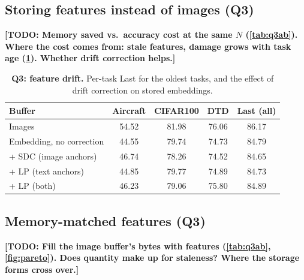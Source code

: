 \documentclass[10pt,twocolumn,letterpaper]{article}
\newcommand{\TODO}[1]{\textbf{\color{red}[TODO: #1]}}
\newcommand{\Q}[1]{\textbf{Q#1}\xspace}     %
\begin{document}
\subsection{Storing features instead of images (\Q{3})}
\label{sec:disc-q3a}
\TODO{Memory saved vs.\ accuracy cost at the same $N$ (\cref{tab:q3ab}). Where the cost comes from: stale features, damage grows with task age (\cref{tab:drift}). Whether drift correction helps.}

\begin{table}[t]
\centering
\small
\setlength{\tabcolsep}{4pt}
\caption{\textbf{\Q{3}: feature drift.} Per-task Last for the oldest tasks,
and the effect of drift correction on stored embeddings.}
\label{tab:drift}
\begin{tabular}{@{}l ccc c@{}}
\toprule
Buffer & Aircraft & CIFAR100 & DTD & Last (all) \\
\midrule
Images                       & 54.52 & 81.98 & 76.06 & 86.17 \\
Embedding, no correction     & 44.55 & 79.74 & 74.73 & 84.79 \\
\quad + SDC (image anchors)  & 46.74 & 78.26 & 74.52 & 84.65 \\
\quad + LP (text anchors)    & 44.85 & 79.77 & 74.89 & 84.73 \\
\quad + LP (both)            & 46.23 & 79.06 & 75.80 & 84.89 \\
\bottomrule
\end{tabular}
\end{table}

\subsection{Memory-matched features (\Q{3})}
\label{sec:disc-q3b}
\TODO{Fill the image buffer's bytes with features (\cref{tab:q3ab}, \cref{fig:pareto}). Does quantity make up for staleness? Where the storage forms cross over.}
\end{document}
